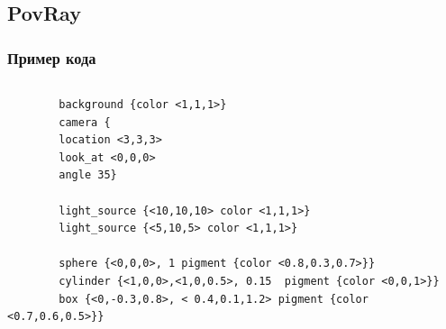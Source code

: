 \documentclass{beamer}
\begin{document}
\subsection{PovRay}
\begin{frame}[fragile]
\frametitle{Пример кода}

\begin{columns}
	\begin{column}{8cm}
	\begin{verbatim}
		background {color <1,1,1>}
		camera {
		location <3,3,3>
		look_at <0,0,0>
		angle 35}

		light_source {<10,10,10> color <1,1,1>}
		light_source {<5,10,5> color <1,1,1>}
		
		sphere {<0,0,0>, 1 pigment {color <0.8,0.3,0.7>}}
		cylinder {<1,0,0>,<1,0,0.5>, 0.15  pigment {color <0,0,1>}}     
		box {<0,-0.3,0.8>, < 0.4,0.1,1.2> pigment {color <0.7,0.6,0.5>}} 

	\end{verbatim}
	\end{column}
	\begin{column}{4.5cm}
	\end{column}
\end{columns}
	
  
\end{frame}
\end{document}
